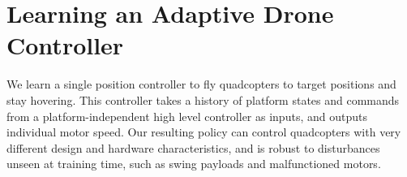 \section{Learning an Adaptive Drone Controller}
\label{sec:method}





We learn a single position controller to fly quadcopters to target positions and stay hovering. This controller takes a history of platform states and commands from a platform-independent high level controller as inputs, and outputs individual motor speed. Our resulting policy can control quadcopters with very different design and hardware characteristics, and is robust to disturbances unseen at training time, such as swing payloads and malfunctioned motors.

